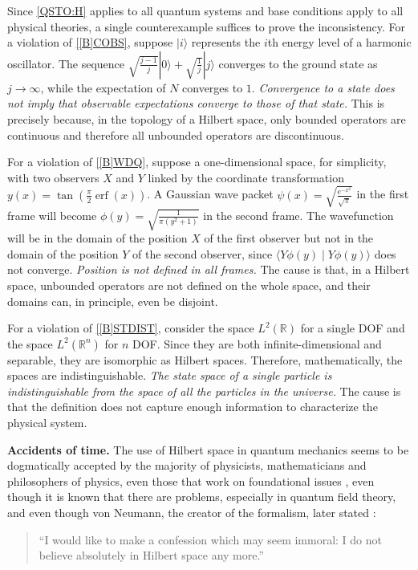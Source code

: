 \documentclass[entropy,article,submit,moreauthors]{Definitions/mdpi}
\def\>{\rangle}
\def\<{\langle}
\DeclareMathOperator{\erf}{erf}
\begin{document}
Since \ref{QSTO:H} applies to all quantum systems and base conditions apply to all physical theories, a single counterexample suffices to prove the inconsistency. For a violation of \ref{[B]COBS}, suppose $|i\>$ represents the $i$th energy level of a harmonic oscillator. The sequence $\sqrt{\frac{j-1}{j}}|0\> + \sqrt{\frac{1}{j}}|j\>$ converges to the ground state as $j \to \infty$, while the expectation of $N$ converges to $1$. \emph{Convergence to a state does not imply that observable expectations converge to those of that state.} This is precisely because, in the topology of a Hilbert space, only bounded operators are continuous and therefore all unbounded operators are discontinuous.

For a violation of \ref{[B]WDQ}, suppose a one-dimensional space, for simplicity, with two observers $X$ and $Y$ linked by the coordinate transformation $y(x) = \tan \left(\frac{\pi}{2} \erf(x) \right)$. A Gaussian wave packet $\psi(x) = \sqrt{\frac{e^{-x^2}}{\sqrt{\pi}}}$ in the first frame will become $\phi(y) = \sqrt{\frac{1}{\pi (y^2 + 1)}}$ in the second frame. The wavefunction will be in the domain of the position $X$ of the first observer but not in the domain of the position $Y$ of the second observer, since $\<Y\phi(y) \mid Y\phi(y)\>$ does not converge. \emph{Position is not defined in all frames.} The cause is that, in a Hilbert space, unbounded operators are not defined on the whole space, and their domains can, in principle, even be disjoint.

For a violation of \ref{[B]STDIST}, consider the space $L^2(\mathbb{R})$ for a single DOF and the space $L^2(\mathbb{R}^n)$ for $n$ DOF. Since they are both infinite-dimensional and separable, they are isomorphic as Hilbert spaces. Therefore, mathematically, the spaces are indistinguishable. \emph{The state space of a single particle is indistinguishable from the space of all the particles in the universe.} The cause is that the definition does not capture enough information to characterize the physical system.

\textbf{Accidents of time.} The use of Hilbert space in quantum mechanics seems to be dogmatically accepted by the majority of physicists, mathematicians and philosophers of physics, even those that work on foundational issues \cite{Halvorson2011}, even though it is known that there are problems, especially in quantum field theory, and even though von Neumann, the creator of the formalism, later stated \cite{Redei1996}:
\begin{quote}
	``I would like to make a confession which may seem immoral: I do not believe absolutely in Hilbert space any more.''
\end{quote}
\end{document}
